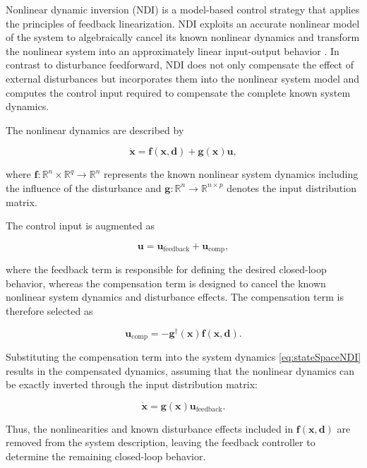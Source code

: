 Nonlinear dynamic inversion (NDI) is a model-based control strategy that applies the principles of feedback linearization. NDI exploits an accurate nonlinear model of the system to algebraically cancel its known nonlinear dynamics and transform the nonlinear system into an approximately linear input-output behavior \cite{Stevens2015AircraftControl, Slotine1991AppliedNC}. In contrast to disturbance feedforward, NDI does not only compensate the effect of external disturbances but incorporates them into the nonlinear system model and computes the control input required to compensate the complete known system dynamics.

The nonlinear dynamics are described by

\begin{equation}
	\dot{\bm{x}}
	=
	\bm{f}(\bm{x},\bm{d})
	+
	\bm{g}(\bm{x})\bm{u},
	\label{eq:stateSpaceNDI}
\end{equation}


where $\bm{f}: \mathbb{R}^{n} \times \mathbb{R}^q \rightarrow \mathbb{R}^{n}$ represents the known nonlinear system dynamics including the influence of the disturbance and $\bm{g}: \mathbb{R}^{n} \rightarrow \mathbb{R}^{n \times p}$ denotes the input distribution matrix.

The control input is augmented as

\begin{equation}
	\bm{u}
	=
	\bm{u}_{\mathrm{feedback}}
	+
	\bm{u}_{\mathrm{comp}},
\end{equation}

where the feedback term is responsible for defining the desired closed-loop behavior, whereas the compensation term is designed to cancel the known nonlinear system dynamics and disturbance effects. The compensation term is therefore selected as

\begin{equation}
	\bm{u}_{\mathrm{comp}}
	=
	-
	\bm{g}^{\dagger}(\bm{x})
	\bm{f}(\bm{x},\bm{d}).
\end{equation}

Substituting the compensation term into the system dynamics \eqref{eq:stateSpaceNDI} results in the compensated dynamics, assuming that the nonlinear dynamics can be exactly inverted through the input distribution matrix:

\begin{equation}
	\dot{\bm{x}}
	=
	\bm{g}(\bm{x})
	\bm{u}_{\mathrm{feedback}}.
\end{equation}

Thus, the nonlinearities and known disturbance effects included in $\bm{f}(\bm{x},\bm{d})$ are removed from the system description, leaving the feedback controller to determine the remaining closed-loop behavior.





